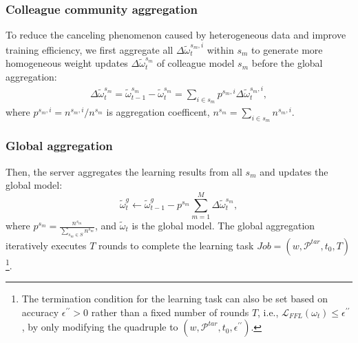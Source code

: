 \documentclass[lettersize,journal]{IEEEtran}
\begin{document}
\subsubsection{Colleague community aggregation} 
To reduce the canceling phenomenon caused by heterogeneous data and improve training efficiency,  we first aggregate all $\Delta \widetilde{\omega}_{t}^{s_{m}, i}$ within $s_m$ to generate more homogeneous weight updates $\Delta\widetilde{\omega}_{t}^{s_{m}}$ of colleague model $s_m$ before the global aggregation: %
\begin{equation}
    \begin{gathered}
     \Delta\widetilde{\omega}_{t}^{s_{m}} =  \widetilde{\omega}_{t-1}^{s_{m}}-\widetilde{\omega}_{t}^{s_{m}}
     = \sum_{i \in s_{m}} p^{s_{m}, i}\Delta \widetilde{\omega}_{t}^{s_{m},i},
     \end{gathered}
\end{equation}
where $p^{s_{m}, i}= {n^{s_{m}, i}}/{n^{s_{m}}}$ is aggregation coefficent, $n^{s_{m}}=\sum_{i \in s_{m}} n^{s_{m}, i}$.

\subsubsection{Global aggregation} 
Then, the server aggregates the learning results from all $s_m$ and updates the global model:
\begin{equation}
\widetilde{\omega}^g_{t} \leftarrow \widetilde{\omega}^g_{t-1} - p^{s_{m}} \sum_{m=1}^{M} \Delta\widetilde{\omega}_{t}^{s_{m}},
\end{equation}
where $p^{s_{m}}= \frac{n^{s_m}}{\sum_{s_{m} \in S} n^{s_m}}$, and $\widetilde{\omega}_{t}$ is the global model. The global aggregation iteratively executes $T$ rounds to complete the learning task $Job=(w,\mathcal{P}^{tar},t_0, T)$\footnote{The termination condition for the learning task can also be set based on accuracy $\epsilon^{\prime\prime}>0$ rather than a fixed number of rounds $T$, i.e., $\mathcal{L}_{FFL}(\omega_t)\leq \epsilon^{\prime\prime}$, by only modifying the quadruple to $(w,\mathcal{P}^{tar},t_0, \epsilon^{\prime\prime})$.}.
\end{document}
